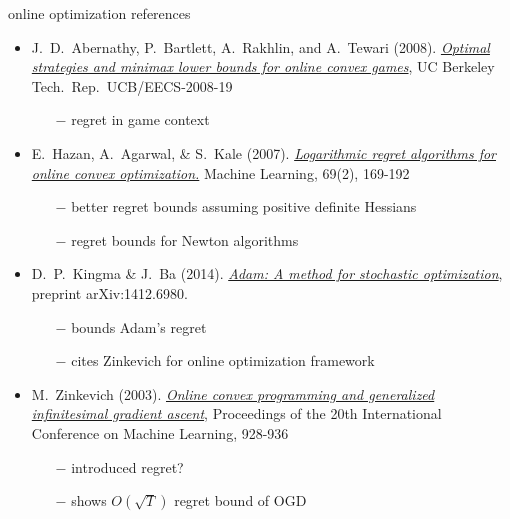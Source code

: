 \documentclass[xcolor={svgnames},
               hyperref={colorlinks,citecolor=DeepPink4,linkcolor=FireBrick,urlcolor=Maroon}]
               {beamer}
\begin{document}
\begin{frame}{online optimization references}

\begin{itemize}
\footnotesize
\item J.~D.~Abernathy, P.~Bartlett, A.~Rakhlin, and A.~Tewari (2008). \href{https://www2.eecs.berkeley.edu/Pubs/TechRpts/2008/EECS-2008-19.pdf}{\emph{Optimal strategies and minimax lower bounds for online convex games}}, UC Berkeley Tech.~Rep.~UCB/EECS-2008-19
    \begin{itemize}
    \scriptsize
    \item[$-$] regret in game context
    \end{itemize}
\item E.~Hazan, A.~Agarwal, \& S.~Kale (2007).  \href{https://link.springer.com/content/pdf/10.1007/s10994-007-5016-8.pdf}{\emph{Logarithmic regret algorithms for online convex optimization.}} Machine Learning, 69(2), 169-192
    \begin{itemize}
    \scriptsize
    \item[$-$] better regret bounds assuming positive definite Hessians
    \item[$-$] regret bounds for Newton algorithms
    \end{itemize}
\item D.~P.~Kingma \& J.~Ba (2014). \href{https://arxiv.org/abs/1412.6980}{\emph{Adam: A method for stochastic optimization}}, preprint arXiv:1412.6980.
    \begin{itemize}
    \scriptsize
    \item[$-$] bounds Adam's regret
    \item[$-$] cites Zinkevich for online optimization framework
    \end{itemize}
\item M.~Zinkevich (2003). \href{https://www.aaai.org/Papers/ICML/2003/ICML03-120.pdf}{\emph{Online convex programming and generalized infinitesimal gradient ascent}}, Proceedings of the 20th International Conference on Machine Learning, 928-936
    \begin{itemize}
    \scriptsize
    \item[$-$] introduced regret?
    \item[$-$] shows $O(\sqrt{T})$ regret bound of OGD
    \end{itemize}
\end{itemize}
\end{frame}
\end{document}
